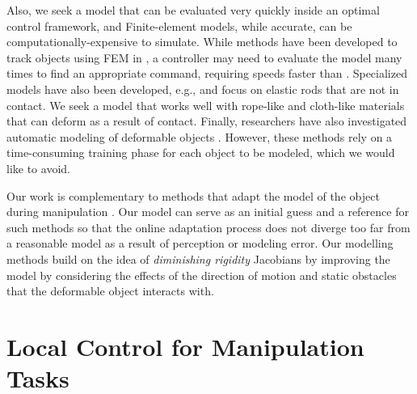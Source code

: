 Also, we seek a model that can be evaluated very quickly inside an optimal control framework, and Finite-element models, while accurate, can be computationally-expensive to simulate. While methods have been developed to track objects using FEM in  \cite{Petit2017}, a controller may need to evaluate the model many times to find an appropriate command, requiring speeds faster than . Specialized models have also been developed, e.g., \cite{Borum2014} and \cite{Bretl2014} focus on elastic rods that are not in contact. We seek a model that works well with rope-like and cloth-like materials that can deform as a result of contact. Finally, researchers have also investigated automatic modeling of deformable objects \cite{Lang2002, Cretu2008}. However, these methods rely on a time-consuming training phase for each object to be modeled, which we would like to avoid.

Our work is complementary to methods that adapt the model of the object during manipulation \cite{Navarro-Alarcon2014, NavarroAlarcon2018, Hu2018deformable_gpr}. Our model can serve as an initial guess and a reference for such methods so that the online adaptation process does not diverge too far from a reasonable model as a result of perception or modeling error. Our modelling methods build on the idea of \textit{diminishing rigidity} Jacobians \cite{Berenson2013} by improving the model by considering the effects of the direction of motion and static obstacles that the deformable object interacts with.


\section{Local Control for Manipulation Tasks}


